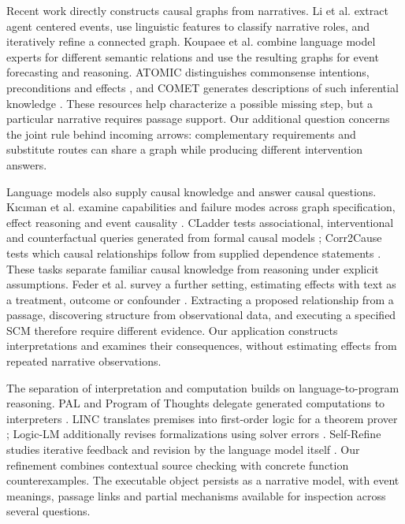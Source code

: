 \documentclass{svproc}
\begin{document}
Recent work directly constructs causal graphs from narratives. Li et al. \cite{li2025} extract agent centered events, use linguistic features to classify narrative roles, and iteratively refine a connected graph. Koupaee et al. \cite{koupaee2025} combine language model experts for different semantic relations and use the resulting graphs for event forecasting and reasoning. ATOMIC distinguishes commonsense intentions, preconditions and effects \cite{sap2019}, and COMET generates descriptions of such inferential knowledge \cite{bosselut2019}. These resources help characterize a possible missing step, but a particular narrative requires passage support. Our additional question concerns the joint rule behind incoming arrows: complementary requirements and substitute routes can share a graph while producing different intervention answers.

Language models also supply causal knowledge and answer causal questions. K{\i}c{\i}man et al. examine capabilities and failure modes across graph specification, effect reasoning and event causality \cite{kiciman2024}. CLadder tests associational, interventional and counterfactual queries generated from formal causal models \cite{jin2023}; Corr2Cause tests which causal relationships follow from supplied dependence statements \cite{jin2024}. These tasks separate familiar causal knowledge from reasoning under explicit assumptions. Feder et al. survey a further setting, estimating effects with text as a treatment, outcome or confounder \cite{feder2022}. Extracting a proposed relationship from a passage, discovering structure from observational data, and executing a specified SCM therefore require different evidence. Our application constructs interpretations and examines their consequences, without estimating effects from repeated narrative observations.

The separation of interpretation and computation builds on language-to-program reasoning. PAL and Program of Thoughts delegate generated computations to interpreters \cite{gao2023,chen2023}. LINC translates premises into first-order logic for a theorem prover \cite{olausson2023}; Logic-LM additionally revises formalizations using solver errors \cite{pan2023}. Self-Refine studies iterative feedback and revision by the language model itself \cite{madaan2023}. Our refinement combines contextual source checking with concrete function counterexamples. The executable object persists as a narrative model, with event meanings, passage links and partial mechanisms available for inspection across several questions.
\end{document}
